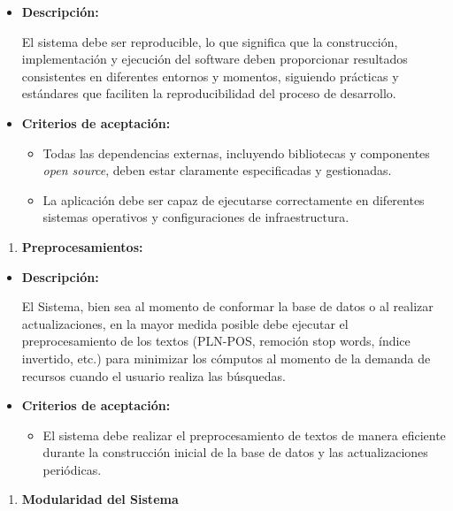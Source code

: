 \documentclass[
  12pt,
  openany]{book}
\providecommand{\tightlist}{%
  \setlength{\itemsep}{0pt}\setlength{\parskip}{0pt}}
\begin{document}
\begin{itemize}
\item
  \textbf{Descripción:}

  El sistema debe ser reproducible, lo que significa que la construcción, implementación y ejecución del software deben proporcionar resultados consistentes en diferentes entornos y momentos, siguiendo prácticas y estándares que faciliten la reproducibilidad del proceso de desarrollo.
\item
  \textbf{Criterios de aceptación:}

  \begin{itemize}
  \item
    Todas las dependencias externas, incluyendo bibliotecas y componentes \emph{open source}, deben estar claramente especificadas y gestionadas.
  \item
    La aplicación debe ser capaz de ejecutarse correctamente en diferentes sistemas operativos y configuraciones de infraestructura.
  \end{itemize}
\end{itemize}

\begin{enumerate}
\def\labelenumi{\arabic{enumi}.}
\setcounter{enumi}{3}
\tightlist
\item
  \textbf{Preprocesamientos:}
\end{enumerate}

\begin{itemize}
\item
  \textbf{Descripción:}

  El Sistema, bien sea al momento de conformar la base de datos o al realizar actualizaciones, en la mayor medida posible debe ejecutar el preprocesamiento de los textos (PLN-POS, remoción stop words, índice invertido, etc.) para minimizar los cómputos al momento de la demanda de recursos cuando el usuario realiza las búsquedas.
\item
  \textbf{Criterios de aceptación:}

  \begin{itemize}
  \tightlist
  \item
    El sistema debe realizar el preprocesamiento de textos de manera eficiente durante la construcción inicial de la base de datos y las actualizaciones periódicas.
  \end{itemize}
\end{itemize}

\begin{enumerate}
\def\labelenumi{\arabic{enumi}.}
\setcounter{enumi}{4}
\tightlist
\item
  \textbf{Modularidad del Sistema}
\end{enumerate}
\end{document}
